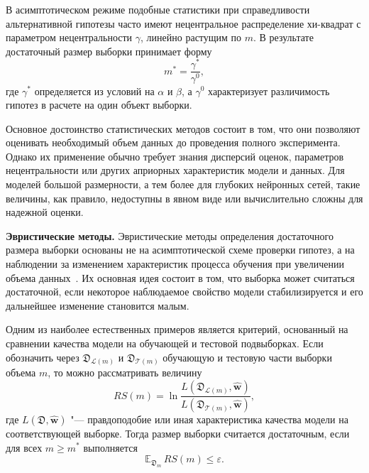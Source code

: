 В асимптотическом режиме подобные статистики при справедливости альтернативной гипотезы часто имеют нецентральное распределение хи-квадрат с параметром нецентральности $\gamma$, линейно растущим по $m$. В результате достаточный размер выборки принимает форму
\begin{equation}
    \label{eq:review-stat-mstar}
    m^*=\frac{\gamma^*}{\gamma^0},
\end{equation}
где $\gamma^*$ определяется из условий на $\alpha$ и $\beta$, а $\gamma^0$ характеризует различимость гипотез в расчете на один объект выборки.

Основное достоинство статистических методов состоит в том, что они позволяют оценивать необходимый объем данных до проведения полного эксперимента. Однако их применение обычно требует знания дисперсий оценок, параметров нецентральности или других априорных характеристик модели и данных. Для моделей большой размерности, а тем более для глубоких нейронных сетей, такие величины, как правило, недоступны в явном виде или вычислительно сложны для надежной оценки.

\textbf{Эвристические методы.} Эвристические методы определения достаточного размера выборки основаны не на асимптотической схеме проверки гипотез, а на наблюдении за изменением характеристик процесса обучения при увеличении объема данных~\cite{motrenko2014,qumsiyeh2013}. Их основная идея состоит в том, что выборка может считаться достаточной, если некоторое наблюдаемое свойство модели стабилизируется и его дальнейшее изменение становится малым.

Одним из наиболее естественных примеров является критерий, основанный на сравнении качества модели на обучающей и тестовой подвыборках. Если обозначить через $\mathfrak D_{\mathcal L(m)}$ и $\mathfrak D_{\mathcal T(m)}$ обучающую и тестовую части выборки объема $m$, то можно рассматривать величину
\begin{equation}
    \label{eq:review-rs}
    RS(m)
    =
    \ln
    \frac{
        L(\mathfrak D_{\mathcal L(m)}, \hat{\mathbf w})
    }{
        L(\mathfrak D_{\mathcal T(m)}, \hat{\mathbf w})
    },
\end{equation}
где $L(\mathfrak D, \hat{\mathbf w})$ "--- правдоподобие или иная характеристика качества модели на соответствующей выборке. Тогда размер выборки считается достаточным, если для всех $m\ge m^*$ выполняется
\begin{equation}
    \label{eq:review-rs-mstar}
    \mathbb E_{\mathfrak D_m}\,RS(m)\le \varepsilon.
\end{equation}

